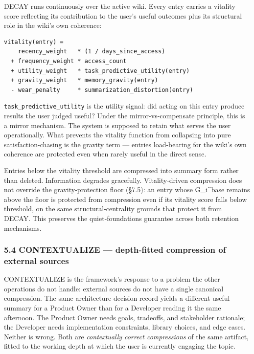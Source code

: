 \documentclass[
  11pt,
]{article}
\begin{document}
DECAY runs continuously over the active wiki. Every entry carries a
vitality score reflecting its contribution to the user's useful outcomes
plus its structural role in the wiki's own coherence:

\begin{verbatim}
vitality(entry) =
    recency_weight   * (1 / days_since_access)
  + frequency_weight * access_count
  + utility_weight   * task_predictive_utility(entry)
  + gravity_weight   * memory_gravity(entry)
  - wear_penalty     * summarization_distortion(entry)
\end{verbatim}

\texttt{task\_predictive\_utility} is the utility signal: did acting on
this entry produce results the user judged useful? Under the
mirror-vs-compensate principle, this is a mirror mechanism. The system
is supposed to retain what serves the user operationally. What prevents
the vitality function from collapsing into pure satisfaction-chasing is
the gravity term --- entries load-bearing for the wiki's own coherence
are protected even when rarely useful in the direct sense.

Entries below the vitality threshold are compressed into summary form
rather than deleted. Information degrades gracefully. Vitality-driven
compression does not override the gravity-protection floor (§7.5): an
entry whose G\_i\^{}base remains above the floor is protected from
compression even if its vitality score falls below threshold, on the
same structural-centrality grounds that protect it from DECAY. This
preserves the quiet-foundations guarantee across both retention
mechanisms.

\hypertarget{contextualize-depth-fitted-compression-of-external-sources}{%
\subsubsection{5.4 CONTEXTUALIZE --- depth-fitted compression of
external
sources}\label{contextualize-depth-fitted-compression-of-external-sources}}

CONTEXTUALIZE is the framework's response to a problem the other
operations do not handle: external sources do not have a single
canonical compression. The same architecture decision record yields a
different useful summary for a Product Owner than for a Developer
reading it the same afternoon. The Product Owner needs goals, tradeoffs,
and stakeholder rationale; the Developer needs implementation
constraints, library choices, and edge cases. Neither is wrong. Both are
\emph{contextually correct compressions} of the same artifact, fitted to
the working depth at which the user is currently engaging the topic.
\end{document}
